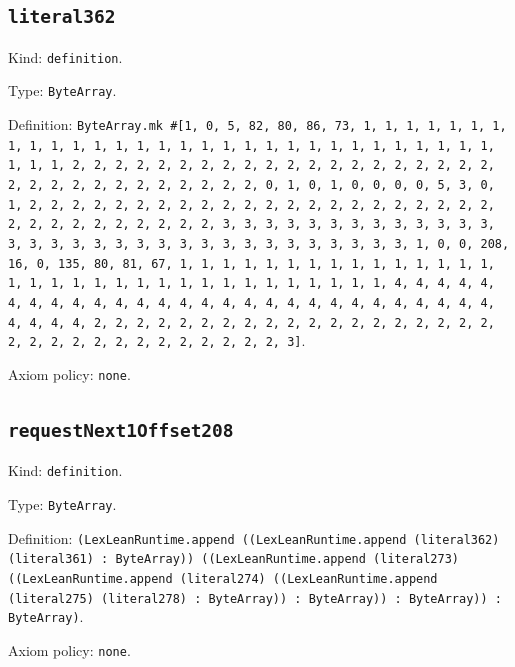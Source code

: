 \documentclass[11pt]{article}
\begin{document}
\subsection*{\texttt{literal362}}
\noindent Kind: \texttt{definition}.\par
\noindent Type: \texttt{ByteArray}.\par
\noindent Definition: \texttt{ByteArray.mk \#[1, 0, 5, 82, 80, 86, 73, 1, 1, 1, 1, 1, 1, 1, 1, 1, 1, 1, 1, 1, 1, 1, 1, 1, 1, 1, 1, 1, 1, 1, 1, 1, 1, 1, 1, 1, 1, 1, 1, 1, 2, 2, 2, 2, 2, 2, 2, 2, 2, 2, 2, 2, 2, 2, 2, 2, 2, 2, 2, 2, 2, 2, 2, 2, 2, 2, 2, 2, 2, 2, 2, 2, 0, 1, 0, 1, 0, 0, 0, 0, 5, 3, 0, 1, 2, 2, 2, 2, 2, 2, 2, 2, 2, 2, 2, 2, 2, 2, 2, 2, 2, 2, 2, 2, 2, 2, 2, 2, 2, 2, 2, 2, 2, 2, 2, 2, 3, 3, 3, 3, 3, 3, 3, 3, 3, 3, 3, 3, 3, 3, 3, 3, 3, 3, 3, 3, 3, 3, 3, 3, 3, 3, 3, 3, 3, 3, 3, 3, 1, 0, 0, 208, 16, 0, 135, 80, 81, 67, 1, 1, 1, 1, 1, 1, 1, 1, 1, 1, 1, 1, 1, 1, 1, 1, 1, 1, 1, 1, 1, 1, 1, 1, 1, 1, 1, 1, 1, 1, 1, 1, 1, 4, 4, 4, 4, 4, 4, 4, 4, 4, 4, 4, 4, 4, 4, 4, 4, 4, 4, 4, 4, 4, 4, 4, 4, 4, 4, 4, 4, 4, 4, 4, 4, 2, 2, 2, 2, 2, 2, 2, 2, 2, 2, 2, 2, 2, 2, 2, 2, 2, 2, 2, 2, 2, 2, 2, 2, 2, 2, 2, 2, 2, 2, 2, 2, 3]}.\par
\noindent Axiom policy: \texttt{none}.\par
\subsection*{\texttt{requestNext1Offset208}}
\noindent Kind: \texttt{definition}.\par
\noindent Type: \texttt{ByteArray}.\par
\noindent Definition: \texttt{(LexLeanRuntime.append ((LexLeanRuntime.append (literal362) (literal361) : ByteArray)) ((LexLeanRuntime.append (literal273) ((LexLeanRuntime.append (literal274) ((LexLeanRuntime.append (literal275) (literal278) : ByteArray)) : ByteArray)) : ByteArray)) : ByteArray)}.\par
\noindent Axiom policy: \texttt{none}.\par
\end{document}
